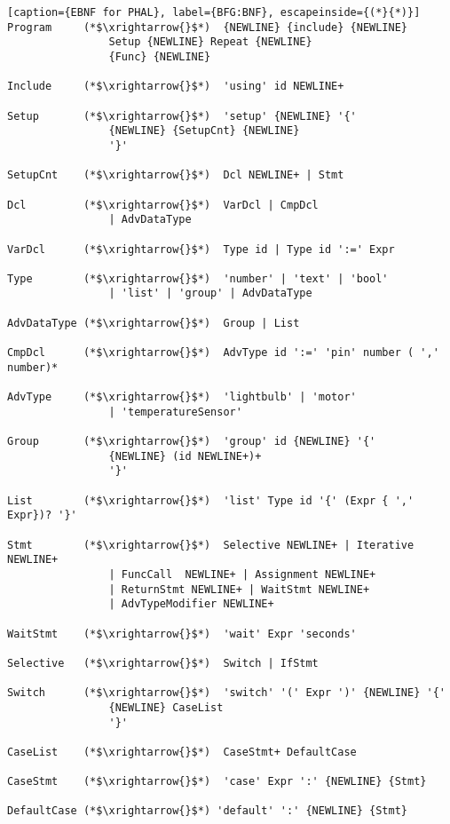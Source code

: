 \begin{lstlisting}[caption={EBNF for PHAL}, label={BFG:BNF}, escapeinside={(*}{*)}]
Program     (*$\xrightarrow{}$*)  {NEWLINE} {include} {NEWLINE} 
                Setup {NEWLINE} Repeat {NEWLINE} 
                {Func} {NEWLINE}

Include	    (*$\xrightarrow{}$*)  'using' id NEWLINE+

Setup       (*$\xrightarrow{}$*)  'setup' {NEWLINE} '{' 
                {NEWLINE} {SetupCnt} {NEWLINE} 
                '}'

SetupCnt    (*$\xrightarrow{}$*)  Dcl NEWLINE+ | Stmt 

Dcl 	    (*$\xrightarrow{}$*)  VarDcl | CmpDcl   
                | AdvDataType

VarDcl	    (*$\xrightarrow{}$*)  Type id | Type id ':=' Expr

Type	    (*$\xrightarrow{}$*)  'number' | 'text' | 'bool'
                | 'list' | 'group' | AdvDataType
            
AdvDataType (*$\xrightarrow{}$*)  Group | List 

CmpDcl	    (*$\xrightarrow{}$*)  AdvType id ':=' 'pin' number ( ',' number)*

AdvType	    (*$\xrightarrow{}$*)  'lightbulb' | 'motor'  
                | 'temperatureSensor'

Group	    (*$\xrightarrow{}$*)  'group' id {NEWLINE} '{' 
                {NEWLINE} (id NEWLINE+)+ 
                '}'

List	    (*$\xrightarrow{}$*)  'list' Type id '{' (Expr { ',' Expr})? '}'

Stmt	    (*$\xrightarrow{}$*)  Selective NEWLINE+ | Iterative NEWLINE+ 
                | FuncCall  NEWLINE+ | Assignment NEWLINE+  
                | ReturnStmt NEWLINE+ | WaitStmt NEWLINE+  
                | AdvTypeModifier NEWLINE+

WaitStmt    (*$\xrightarrow{}$*)  'wait' Expr 'seconds'

Selective   (*$\xrightarrow{}$*)  Switch | IfStmt

Switch	    (*$\xrightarrow{}$*)  'switch' '(' Expr ')' {NEWLINE} '{' 
                {NEWLINE} CaseList 
                '}'

CaseList    (*$\xrightarrow{}$*)  CaseStmt+ DefaultCase

CaseStmt    (*$\xrightarrow{}$*)  'case' Expr ':' {NEWLINE} {Stmt} 

DefaultCase (*$\xrightarrow{}$*) 'default' ':' {NEWLINE} {Stmt}


\end{lstlisting}
